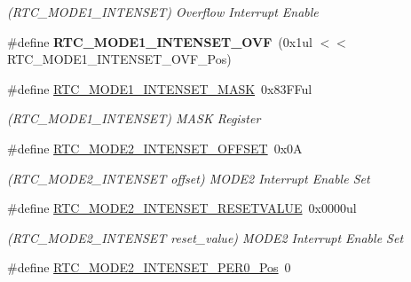\begin{DoxyCompactItemize}
\begin{DoxyCompactList}\small\item\em (R\+T\+C\+\_\+\+M\+O\+D\+E1\+\_\+\+I\+N\+T\+E\+N\+S\+E\+T) Overflow Interrupt Enable \end{DoxyCompactList}\item 
\hypertarget{group___s_a_m_l21___r_t_c_ga66ec35d3bcea2f645807f60869e84aa6}{}\#define {\bfseries R\+T\+C\+\_\+\+M\+O\+D\+E1\+\_\+\+I\+N\+T\+E\+N\+S\+E\+T\+\_\+\+O\+V\+F}~(0x1ul $<$$<$ R\+T\+C\+\_\+\+M\+O\+D\+E1\+\_\+\+I\+N\+T\+E\+N\+S\+E\+T\+\_\+\+O\+V\+F\+\_\+\+Pos)\label{group___s_a_m_l21___r_t_c_ga66ec35d3bcea2f645807f60869e84aa6}

\item 
\hypertarget{group___s_a_m_l21___r_t_c_ga83a000c364a11d8c42d2f9bc0c398c6a}{}\#define \hyperlink{group___s_a_m_l21___r_t_c_ga83a000c364a11d8c42d2f9bc0c398c6a}{R\+T\+C\+\_\+\+M\+O\+D\+E1\+\_\+\+I\+N\+T\+E\+N\+S\+E\+T\+\_\+\+M\+A\+S\+K}~0x83\+F\+Ful\label{group___s_a_m_l21___r_t_c_ga83a000c364a11d8c42d2f9bc0c398c6a}

\begin{DoxyCompactList}\small\item\em (R\+T\+C\+\_\+\+M\+O\+D\+E1\+\_\+\+I\+N\+T\+E\+N\+S\+E\+T) M\+A\+S\+K Register \end{DoxyCompactList}\item 
\hypertarget{group___s_a_m_l21___r_t_c_ga37b3d573b6ec27f20e2e2a5a70109e5f}{}\#define \hyperlink{group___s_a_m_l21___r_t_c_ga37b3d573b6ec27f20e2e2a5a70109e5f}{R\+T\+C\+\_\+\+M\+O\+D\+E2\+\_\+\+I\+N\+T\+E\+N\+S\+E\+T\+\_\+\+O\+F\+F\+S\+E\+T}~0x0\+A\label{group___s_a_m_l21___r_t_c_ga37b3d573b6ec27f20e2e2a5a70109e5f}

\begin{DoxyCompactList}\small\item\em (R\+T\+C\+\_\+\+M\+O\+D\+E2\+\_\+\+I\+N\+T\+E\+N\+S\+E\+T offset) M\+O\+D\+E2 Interrupt Enable Set \end{DoxyCompactList}\item 
\hypertarget{group___s_a_m_l21___r_t_c_ga71919a0f6a4504b67412c7634e5ebc48}{}\#define \hyperlink{group___s_a_m_l21___r_t_c_ga71919a0f6a4504b67412c7634e5ebc48}{R\+T\+C\+\_\+\+M\+O\+D\+E2\+\_\+\+I\+N\+T\+E\+N\+S\+E\+T\+\_\+\+R\+E\+S\+E\+T\+V\+A\+L\+U\+E}~0x0000ul\label{group___s_a_m_l21___r_t_c_ga71919a0f6a4504b67412c7634e5ebc48}

\begin{DoxyCompactList}\small\item\em (R\+T\+C\+\_\+\+M\+O\+D\+E2\+\_\+\+I\+N\+T\+E\+N\+S\+E\+T reset\+\_\+value) M\+O\+D\+E2 Interrupt Enable Set \end{DoxyCompactList}\item 
\hypertarget{group___s_a_m_l21___r_t_c_gadace601b886fd7b36e034d51ad54620b}{}\#define \hyperlink{group___s_a_m_l21___r_t_c_gadace601b886fd7b36e034d51ad54620b}{R\+T\+C\+\_\+\+M\+O\+D\+E2\+\_\+\+I\+N\+T\+E\+N\+S\+E\+T\+\_\+\+P\+E\+R0\+\_\+\+Pos}~0\label{group___s_a_m_l21___r_t_c_gadace601b886fd7b36e034d51ad54620b}


\end{DoxyCompactItemize}
